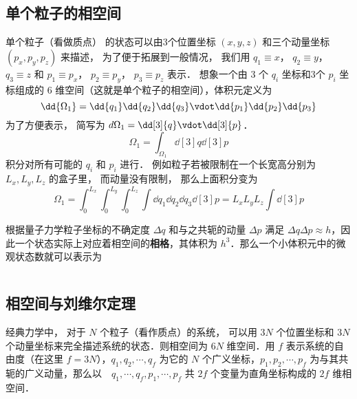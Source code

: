 
\begin{issues}
\issueDraft
\end{issues}

\subsection{单个粒子的相空间}

单个粒子（看做质点） 的状态可以由3个位置坐标 $(x,y,z)$ 和三个动量坐标 $(p_x, p_y, p_z)$ 来描述， 为了便于拓展到一般情况， 我们用 $q_1 \equiv x$，   $q_2 \equiv y$， $q_3 \equiv z$   和 $p_1 \equiv p_x$， $p_2 \equiv p_y$， $p_3 \equiv p_z$ 表示． 想象一个由 3 个 $q_i$  坐标和3个 $p_i$  坐标组成的 $6$ 维空间（这就是单个粒子的相空间），体积元定义为
\begin{equation}
\dd{\Omega_1} = \dd{q_1}\dd{q_2}\dd{q_3} \vdot \dd{p_1}\dd{p_2}\dd{p_3}
\end{equation} 
为了方便表示， 简写为  $d{\Omega_1} = \dd[3]{q} \vdot \dd[3]{p}$． 
\begin{equation}
\Omega_1 = \int_{\Omega_1} \dd[3]{q} \dd[3]{p}
\end{equation} 
积分对所有可能的 $q_i$ 和 $p_i$ 进行． 例如粒子若被限制在一个长宽高分别为 $L_x, L_y, L_z$ 的盒子里， 而动量没有限制， 那么上面积分变为
\begin{equation}
\Omega_1 = \int_0^{L_x} \int_0^{L_y} \int_0^{L_z} \int \dd{q_1} \dd{q_2} \dd{q_3} \dd[3]{p} = L_x L_y L_z\int \dd[3]{p} 
\end{equation} 

根据量子力学粒子坐标的不确定度 $\Delta q$ 和与之共轭的动量 $\Delta p$ 满足 $\Delta q\Delta p\approx h$，因此一个状态实际上对应着相空间的\textbf{相格}，其体积为 $h^3$．那么一个小体积元中的微观状态数就可以表示为

\begin{equation}

\end{equation}

\subsection{相空间与刘维尔定理}
经典力学中， 对于 $N$ 个粒子（看作质点）的系统， 可以用 $3N$ 个位置坐标和 $3N$ 个动量坐标来完全描述系统的状态．则相空间为 $6N$ 维空间．用 $f$ 表示系统的自由度（在这里 $f=3N$），$q_1,q_2,\cdots,q_f$ 为它的 $N$ 个广义坐标，$p_1,p_2,\cdots,p_f$ 为与其共轭的广义动量，那么以　$q_1,\cdots,q_f,p_1,\cdots,p_f$ 共 $2f$ 个变量为直角坐标构成的 $2f$ 维相空间．

